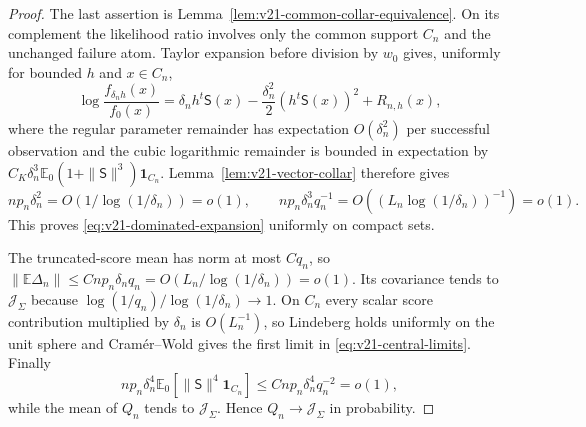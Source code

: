 \begin{proof}
The last assertion is Lemma~\ref{lem:v21-common-collar-equivalence}.  On its
complement the likelihood ratio involves only the common support $C_n$ and
the unchanged failure atom.  Taylor expansion before division by $w_0$ gives,
uniformly for bounded $h$ and $x\in C_n$,
\[
 \log\frac{f_{\delta_nh}(x)}{f_0(x)}
 =\delta_nh^t\mathsf S(x)
 -\frac{\delta_n^2}{2}(h^t\mathsf S(x))^2
 +R_{n,h}(x),
\]
where the regular parameter remainder has expectation
$O(\delta_n^2)$ per successful observation and the cubic logarithmic
remainder is bounded in expectation by
$C_K\delta_n^3\mathbb E_0(1+\|\mathsf S\|^3)\mathbf1_{C_n}$.
Lemma~\ref{lem:v21-vector-collar} therefore gives
\[
 np_n\delta_n^2=O(1/\log(1/\delta_n))=o(1),
 \qquad
 np_n\delta_n^3q_n^{-1}
 =O((L_n\log(1/\delta_n))^{-1})=o(1).
\]
This proves \eqref{eq:v21-dominated-expansion} uniformly on compact sets.

The truncated-score mean has norm at most $Cq_n$, so
$\|\mathbb E\Delta_n\|\le Cnp_n\delta_nq_n
=O(L_n/\log(1/\delta_n))=o(1)$.  Its covariance tends to
$\mathcal J_\Sigma$ because
$\log(1/q_n)/\log(1/\delta_n)\to1$.  On $C_n$ every scalar score
contribution multiplied by $\delta_n$ is $O(L_n^{-1})$, so Lindeberg holds
uniformly on the unit sphere and Cram\'er--Wold gives the first limit in
\eqref{eq:v21-central-limits}.  Finally
\[
 np_n\delta_n^4
 \mathbb E_0[\|\mathsf S\|^4\mathbf1_{C_n}]
 \le Cnp_n\delta_n^4q_n^{-2}=o(1),
\]
while the mean of $Q_n$ tends to $\mathcal J_\Sigma$.  Hence
$Q_n\to\mathcal J_\Sigma$ in probability.
\end{proof}

